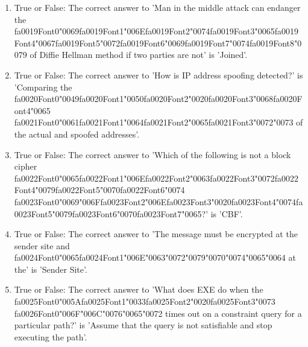 \documentclass[12pt]{article}
\begin{document}
\begin{enumerate}[label=\arabic*.]
\item True or False: The correct answer to 'Man in the middle attack can endanger the {\csname fa0019Font0\endcsname\char"0069}{\csname fa0019Font1\endcsname\char"006E}{\csname fa0019Font2\endcsname\char"0074}{\csname fa0019Font3\endcsname\char"0065}{\csname fa0019Font4\endcsname\char"0067}{\csname fa0019Font5\endcsname\char"0072}{\csname fa0019Font6\endcsname\char"0069}{\csname fa0019Font7\endcsname\char"0074}{\csname fa0019Font8\endcsname\char"0079} of Diffie Hellman method if two parties are not' is 'Joined'.
\item True or False: The correct answer to 'How is IP address spoofing detected?' is 'Comparing the {\csname fa0020Font0\endcsname\char"0049}{\csname fa0020Font1\endcsname\char"0050}{\csname fa0020Font2\endcsname\char"0020}{\csname fa0020Font3\endcsname\char"0068}{\csname fa0020Font4\endcsname\char"0065} {\csname fa0021Font0\endcsname\char"0061}{\csname fa0021Font1\endcsname\char"0064}{\csname fa0021Font2\endcsname\char"0065}{\csname fa0021Font3\endcsname\char"0072}{\char"0073} of the actual and spoofed addresses'.
\item True or False: The correct answer to 'Which of the following is not a block cipher {\csname fa0022Font0\endcsname\char"0065}{\csname fa0022Font1\endcsname\char"006E}{\csname fa0022Font2\endcsname\char"0063}{\csname fa0022Font3\endcsname\char"0072}{\csname fa0022Font4\endcsname\char"0079}{\csname fa0022Font5\endcsname\char"0070}{\csname fa0022Font6\endcsname\char"0074} {\csname fa0023Font0\endcsname\char"0069}{\char"006F}{\csname fa0023Font2\endcsname\char"006E}{\csname fa0023Font3\endcsname\char"0020}{\csname fa0023Font4\endcsname\char"0074}{\csname fa0023Font5\endcsname\char"0079}{\csname fa0023Font6\endcsname\char"0070}{\csname fa0023Font7\endcsname\char"0065}?' is 'CBF'.
\item True or False: The correct answer to 'The message must be encrypted at the sender site and {\csname fa0024Font0\endcsname\char"0065}{\csname fa0024Font1\endcsname\char"006E}{\char"0063}{\char"0072}{\char"0079}{\char"0070}{\char"0074}{\char"0065}{\char"0064} at the' is 'Sender Site'.
\item True or False: The correct answer to 'What does EXE do when the {\csname fa0025Font0\endcsname\char"005A}{\csname fa0025Font1\endcsname\char"0033}{\csname fa0025Font2\endcsname\char"0020}{\csname fa0025Font3\endcsname\char"0073} {\csname fa0026Font0\endcsname\char"006F}{\char"006C}{\char"0076}{\char"0065}{\char"0072} times out on a constraint query for a particular path?' is 'Assume that the query is not satisfiable and stop executing the path'.
\end{enumerate}
\end{document}
